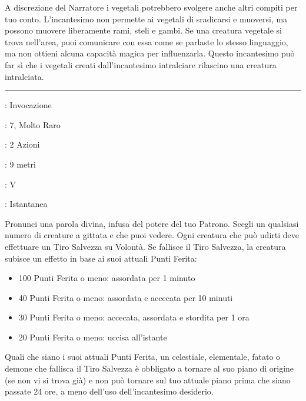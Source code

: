\begin{multicols}{2}
A discrezione del Narratore i vegetali potrebbero svolgere anche altri compiti per tuo conto. L'incantesimo non permette ai vegetali di sradicarsi e muoversi, ma possono muovere liberamente rami, steli e gambi. Se una creatura vegetale si trova nell'area, puoi comunicare con essa come se parlaste lo stesso linguaggio, ma non ottieni alcuna capacità magica per influenzarla. Questo incantesimo può far sì che i vegetali creati dall'incantesimo intralciare rilascino una creatura intralciata.

\smallskip\noindent\rule{\linewidth}{2pt} \hypertarget{Parola Divina}{}\medskip{}
\noindent
\begin{description}[noitemsep, topsep=0pt, parsep=0pt, partopsep=0pt, leftmargin=0cm, labelwidth=2.8cm]
	\item[\textbf{Lista di Magia}]: Invocazione
	\item[\textbf{Livello}]: 7, Molto Raro
	\item[\textbf{T. di Lancio}]: 2 Azioni
	\item[\textbf{Gittata}]: 9 metri
	\item[\textbf{Componenti}]: V
	\item[\textbf{Durata}]: Istantanea
\end{description}

Pronunci una parola divina, infusa del potere del tuo Patrono. Scegli un qualsiasi numero di creature a gittata e che puoi vedere. Ogni creatura che può udirti deve effettuare un Tiro Salvezza su Volontà. Se fallisce il Tiro Salvezza, la creatura subisce un effetto in base ai suoi attuali Punti Ferita:

\begin{itemize}[leftmargin=*] \setlength{\itemsep}{0pt}
	\item 100 Punti Ferita o meno: assordata per 1 minuto
	\item 40 Punti Ferita o meno: assordata e accecata per 10 minuti
	\item 30 Punti Ferita o meno: accecata, assordata e stordita per 1 ora
	\item 20 Punti Ferita o meno: uccisa all'istante
\end{itemize}

Quali che siano i suoi attuali Punti Ferita, un celestiale, elementale, fatato o demone che fallisca il Tiro Salvezza è obbligato a tornare al suo piano di origine (se non vi si trova già) e non può tornare sul tuo attuale piano prima che siano passate 24 ore, a meno dell'uso dell'incantesimo desiderio.


\end{multicols}
